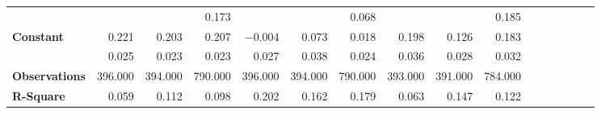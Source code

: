 \begin{tabular}{@{\extracolsep{5pt}}lrrrrrrrrrrrrrrr}
{\bf } & \phantom{***} & \phantom{***} & 0.173\phantom{\phantom{)}***} & \phantom{***} & \phantom{***} & 0.068\phantom{\phantom{)}***} & \phantom{***} & \phantom{***} & 0.185\phantom{\phantom{)}***} \\
{\bf Constant} & 0.221\phantom{\phantom{)}***} & 0.203\phantom{\phantom{)}***} & 0.207\phantom{\phantom{)}***} & $-$0.004\phantom{\phantom{)}***} & 0.073\phantom{\phantom{)}***} & 0.018\phantom{\phantom{)}***} & 0.198\phantom{\phantom{)}***} & 0.126\phantom{\phantom{)}***} & 0.183\phantom{\phantom{)}***} \\
{\bf } & 0.025\phantom{\phantom{)}***} & 0.023\phantom{\phantom{)}***} & 0.023\phantom{\phantom{)}***} & 0.027\phantom{\phantom{)}***} & 0.038\phantom{\phantom{)}***} & 0.024\phantom{\phantom{)}***} & 0.036\phantom{\phantom{)}***} & 0.028\phantom{\phantom{)}***} & 0.032\phantom{\phantom{)}***} \\
{\bf Observations} & 396.000\phantom{\phantom{)}***} & 394.000\phantom{\phantom{)}***} & 790.000\phantom{\phantom{)}***} & 396.000\phantom{\phantom{)}***} & 394.000\phantom{\phantom{)}***} & 790.000\phantom{\phantom{)}***} & 393.000\phantom{\phantom{)}***} & 391.000\phantom{\phantom{)}***} & 784.000\phantom{\phantom{)}***} \\
{\bf R-Square} & 0.059\phantom{***} & 0.112\phantom{***} & 0.098\phantom{***} & 0.202\phantom{***} & 0.162\phantom{***} & 0.179\phantom{***} & 0.063\phantom{***} & 0.147\phantom{***} & 0.122\phantom{***} \\
\hline
\end{tabular}

